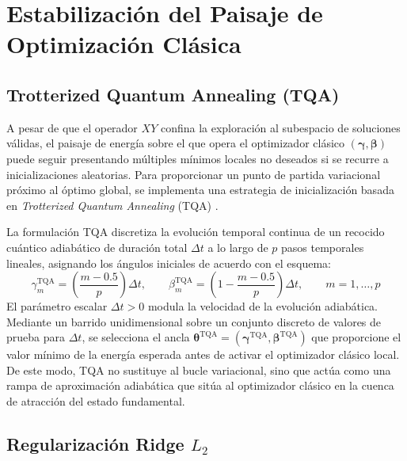 \section{Estabilización del Paisaje de Optimización Clásica}
\label{sec:estabilizacion_optimizacion}

\subsection{Trotterized Quantum Annealing (TQA)}
\label{subsec:tqa_inicializacion}

A pesar de que el operador $XY$ confina la exploración al subespacio de soluciones válidas, el paisaje de energía sobre el que opera el optimizador clásico $(\boldsymbol{\gamma}, \boldsymbol{\beta})$ puede seguir presentando múltiples mínimos locales no deseados si se recurre a inicializaciones aleatorias. Para proporcionar un punto de partida variacional próximo al óptimo global, se implementa una estrategia de inicialización basada en \textit{Trotterized Quantum Annealing} (TQA) \cite{Hadfield2019}.

La formulación TQA discretiza la evolución temporal continua de un recocido cuántico adiabático de duración total $\Delta t$ a lo largo de $p$ pasos temporales lineales, asignando los ángulos iniciales de acuerdo con el esquema:
\begin{equation}
    \gamma_m^{\text{TQA}} = \left( \frac{m - 0.5}{p} \right) \Delta t, \qquad \beta_m^{\text{TQA}} = \left( 1 - \frac{m - 0.5}{p} \right) \Delta t, \qquad m = 1, \dots, p
    \label{eq:tqa_schedule}
\end{equation}
El parámetro escalar $\Delta t > 0$ modula la velocidad de la evolución adiabática. Mediante un barrido unidimensional sobre un conjunto discreto de valores de prueba para $\Delta t$, se selecciona el ancla $\boldsymbol{\theta}^{\text{TQA}} = (\boldsymbol{\gamma}^{\text{TQA}}, \boldsymbol{\beta}^{\text{TQA}})$ que proporcione el valor mínimo de la energía esperada antes de activar el optimizador clásico local. De este modo, TQA no sustituye al bucle variacional, sino que actúa como una rampa de aproximación adiabática que sitúa al optimizador clásico en la cuenca de atracción del estado fundamental.

\subsection{Regularización Ridge $L_2$}
\label{subsec:regularizacion_ridge}

